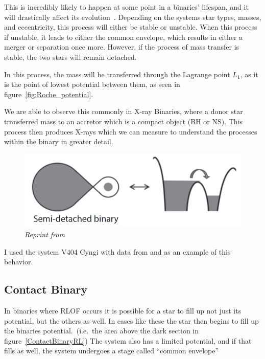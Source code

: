\documentclass[12pt, letterpaper]{article}
\begin{document}
        This is incredibly likely to happen at some point in a binaries' lifespan, and it will drastically affect its evolution~\cite{Chen_2024}. Depending on the systems star types, masses, and  eccentricity, this process will either be stable or unstable. When this process if unstable, it leads to either the common envelope, which results in either a merger or separation once more. However, if the process of mass transfer is stable, the two stars will remain detached.~\cite{Chen_2024}

        In this process, the mass will be transferred through the Lagrange point $L_1$, as it is the point of lowest potential between them, as seen in figure~\ref{fig:Roche_potential}. \cite{TaurisvandenHeuvel+2023}

        We are able to observe this commonly in X-ray Binaries, where a donor star transferred mass to an accretor which is a compact object (BH or NS). This process then produces X-rays which we can measure to understand the processes within the binary in greater detail.
        
       \begin{figure}[h] 
            \centering
            \includegraphics[scale = .4]{Figs/Semi-detached binary.png}
            \caption{\textit{Reprint from~\cite{TaurisvandenHeuvel+2023}}}
            \label{SemidetachedRL}
        \end{figure}
        
        I used the system V404 Cyngi with data from \cite{Bernardini_2016} and \cite{10.1093/mnras/271.1.L10} as an example of this behavior. 

        \subsection{\centering Contact Binary}
        In binaries where RLOF occurs it is possible for a star to fill up not just its potential, but the others as well. In cases like these the star then begins to fill up the binaries potential.\ (i.e.\ the area above the dark section in figure~\ref{ContactBinaryRL}) The system also has a limited potential, and if that fills as well, the system undergoes a stage called ``common envelope''
\end{document}
